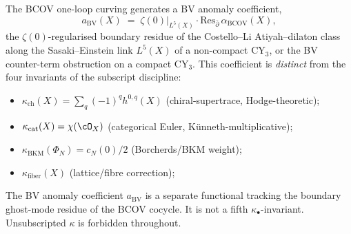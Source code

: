 \begin{remark}
\label{rem:kappa-ch-bv-distinction}
The BCOV one-loop curving generates a BV anomaly coefficient,
\[
 a_{\mathrm{BV}}(X)
 \;=\; \zeta(0)\big|_{L^5(X)} \cdot \mathrm{Res}_{\bar\partial}\,
 \alpha_{\mathrm{BCOV}}(X),
\]
the $\zeta(0)$-regularised boundary residue of the Costello--Li
Atiyah--dilaton class along the Sasaki--Einstein link $L^5(X)$ of a
non-compact CY$_3$, or the BV counter-term obstruction on a compact
CY$_3$. This coefficient is \emph{distinct} from the four invariants of the
subscript discipline:
\begin{itemize}[leftmargin=2em]
 \item $\kappa_{\mathrm{ch}}(X) = \sum_q (-1)^q h^{0,q}(X)$
 (chiral-supertrace, Hodge-theoretic);
 \item $\kappa_{\mathrm{cat}}(X) = \chi(\cO_X)$
 (categorical Euler, Künneth-multiplicative);
 \item $\kappa_{\mathrm{BKM}}(\Phi_N) = c_N(0)/2$
 (Borcherds/BKM weight);
 \item $\kappa_{\mathrm{fiber}}(X)$
 (lattice/fibre correction);
\end{itemize}
The BV anomaly coefficient $a_{\mathrm{BV}}$ is a separate functional
tracking the boundary ghost-mode residue of the BCOV cocycle. It is
not a fifth $\kappa_\bullet$-invariant. Unsubscripted $\kappa$ is
forbidden throughout.


\end{remark}
